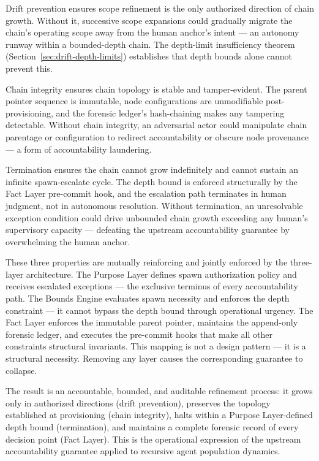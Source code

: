 Drift prevention ensures scope refinement is the only authorized direction of chain growth. Without it, successive scope expansions could gradually migrate the chain's operating scope away from the human anchor's intent — an autonomy runway within a bounded-depth chain. The depth-limit insufficiency theorem (Section~\ref{sec:drift-depth-limits}) establishes that depth bounds alone cannot prevent this.

Chain integrity ensures chain topology is stable and tamper-evident. The parent pointer sequence is immutable, node configurations are unmodifiable post-provisioning, and the forensic ledger's hash-chaining makes any tampering detectable. Without chain integrity, an adversarial actor could manipulate chain parentage or configuration to redirect accountability or obscure node provenance — a form of accountability laundering.

Termination ensures the chain cannot grow indefinitely and cannot sustain an infinite spawn-escalate cycle. The depth bound is enforced structurally by the Fact Layer pre-commit hook, and the escalation path terminates in human judgment, not in autonomous resolution. Without termination, an unresolvable exception condition could drive unbounded chain growth exceeding any human's supervisory capacity — defeating the upstream \bxthree accountability guarantee by overwhelming the human anchor.

These three properties are mutually reinforcing and jointly enforced by the \bxthree three-layer architecture. The Purpose Layer defines spawn authorization policy and receives escalated exceptions — the exclusive terminus of every accountability path. The Bounds Engine evaluates spawn necessity and enforces the depth constraint — it cannot bypass the depth bound through operational urgency. The Fact Layer enforces the immutable parent pointer, maintains the append-only forensic ledger, and executes the pre-commit hooks that make all other constraints structural invariants. This mapping is not a design pattern — it is a structural necessity. Removing any layer causes the corresponding guarantee to collapse.

The result is an accountable, bounded, and auditable refinement process: it grows only in authorized directions (drift prevention), preserves the topology established at provisioning (chain integrity), halts within a Purpose Layer-defined depth bound (termination), and maintains a complete forensic record of every decision point (Fact Layer). This is the operational expression of the upstream \bxthree accountability guarantee applied to recursive agent population dynamics.